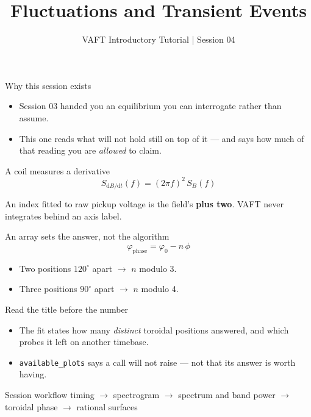 \documentclass[aspectratio=169]{beamer}
\title{Fluctuations and Transient Events}
\subtitle{VAFT Introductory Tutorial | Session 04}
\author{}
\date{}
\begin{document}
\begin{frame}
  \titlepage
\end{frame}

\begin{frame}{Why this session exists}
  \begin{itemize}
    \item Session 03 handed you an equilibrium you can interrogate rather than assume.
    \item This one reads what will not hold still on top of it --- and says how much
      of that reading you are \emph{allowed} to claim.
  \end{itemize}
\end{frame}

\begin{frame}{A coil measures a derivative}
  \centering
  \[ S_{\mathrm{d}B/\mathrm{d}t}(f) = (2\pi f)^{2}\, S_{B}(f) \]
  \vspace{1em}

  An index fitted to raw pickup voltage is the field's \textbf{plus two}.
  VAFT never integrates behind an axis label.
\end{frame}

\begin{frame}{An array sets the answer, not the algorithm}
  \centering
  \[ \varphi_{\text{phase}} = \varphi_{0} - n\,\phi \]
  \vspace{0.5em}

  \begin{itemize}
    \item Two positions $120^{\circ}$ apart \(\rightarrow\) $n$ modulo 3.
    \item Three positions $90^{\circ}$ apart \(\rightarrow\) $n$ modulo 4.
  \end{itemize}
\end{frame}

\begin{frame}{Read the title before the number}
  \begin{itemize}
    \item The fit states how many \emph{distinct} toroidal positions answered,
      and which probes it left on another timebase.
    \item \texttt{available\_plots} says a call will not raise --- not that its
      answer is worth having.
  \end{itemize}
\end{frame}

\begin{frame}{Session workflow}
  \centering
  timing \(\rightarrow\) spectrogram \(\rightarrow\) spectrum and band power
  \(\rightarrow\) toroidal phase \(\rightarrow\) rational surfaces
\end{frame}
\end{document}
